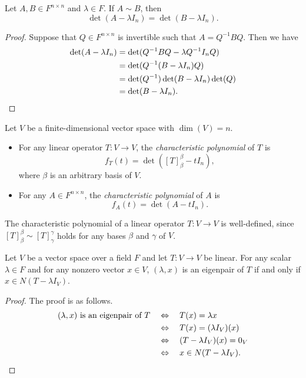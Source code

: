 \begin{theorem}
  Let $A, B \in F^{n \times n}$ and $\lambda \in F$.
  If $A \sim B$, then
  \begin{equation*}
    \det(A - \lambda I_n) = \det(B - \lambda I_n).
  \end{equation*}
\end{theorem}
\begin{proof}
  Suppose that $Q \in F^{n \times n}$ is invertible such that $A = Q^{-1}BQ$.
  Then we have
  \begin{align*}
    \det(A - \lambda I_n)
    &= \det(Q^{-1}BQ - \lambda Q^{-1}I_nQ) \\
    &= \det(Q^{-1}(B - \lambda I_n)Q) \\
    &= \det(Q^{-1})\det(B - \lambda I_n)\det(Q) \\
    &= \det(B - \lambda I_n).
    \qedhere
  \end{align*}
\end{proof}

\begin{definition}
  Let $V$ be a finite-dimensional vector space with $\dim(V) = n$.
  \begin{itemize}
    \item For any linear operator $T: V \to V$, the \emph{characteristic
    polynomial} of $T$ is
    \begin{equation*}
      f_T(t) = \det([T]_\beta^\beta - tI_n),
    \end{equation*}
    where $\beta$ is an arbitrary basis of $V$.
    \item For any $A \in F^{n \times n}$, the \emph{characteristic polynomial}
    of $A$ is
    \begin{equation*}
      f_A(t) = \det(A - tI_n).
    \end{equation*}
  \end{itemize}
\end{definition}
\begin{remark}
  The characteristic polynomial of a linear operator $T: V \to V$ is
  well-defined, since $[T]_\beta^\beta \sim [T]_\gamma^\gamma$ holds for any
  bases $\beta$ and $\gamma$ of $V$.
\end{remark}

\begin{theorem}
  Let $V$ be a vector space over a field $F$ and let $T: V \to V$ be linear.
  For any scalar $\lambda \in F$ and for any nonzero vector $x \in V$,
  $(\lambda, x)$ is an eigenpair of $T$ if and only if
  $x \in N(T - \lambda I_V)$.
\end{theorem}
\begin{proof}
  The proof is as follows.
  \begin{align*}
    \text{$(\lambda, x)$ is an eigenpair of $T$}
    &\quad \Leftrightarrow \quad T(x) = \lambda x \\
    &\quad \Leftrightarrow \quad T(x) = (\lambda I_V)(x) \\
    &\quad \Leftrightarrow \quad (T - \lambda I_V)(x) = 0_V \\
    &\quad \Leftrightarrow \quad x \in N(T - \lambda I_V).
    \qedhere
  \end{align*}
\end{proof}

